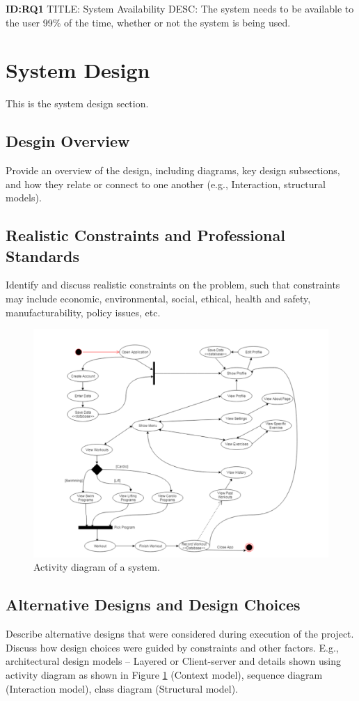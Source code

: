 \documentclass{article}
\begin{document}
\textbf{ID:RQ1} \newline TITLE: System Availability \newline DESC: The system needs to  be available to the user 99\% of the time, whether or not the system is being used.


\section{System Design}
This is the system design section.

\subsection{Desgin Overview}
Provide an overview of the design, including diagrams, key design subsections, and how they relate or connect to one another (e.g., Interaction, structural models).

\subsection{Realistic Constraints and Professional Standards}
Identify and discuss realistic constraints on the problem, such that constraints may include economic, environmental, social, ethical, health and safety, manufacturability, policy issues, etc.

\begin{figure}[!t]\centering
\includegraphics[width=5.0in]{./Figure/ativity.pdf}
\caption{Activity diagram of a system.}\label{fig:act_dia_1}
\end{figure}

\subsection{Alternative Designs and Design Choices}
Describe alternative designs that were considered during execution of the project. Discuss how design choices were guided by constraints and other factors. E.g., architectural design models – Layered or Client-server and details shown using activity diagram as shown in Figure \ref{fig:act_dia_1} (Context model), sequence diagram (Interaction model), class diagram (Structural model).
\end{document}
